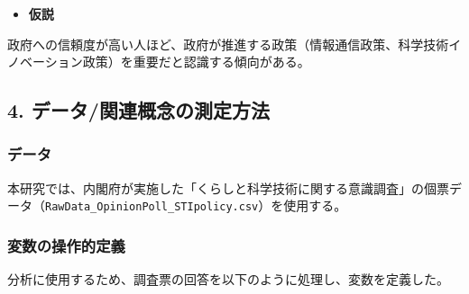 \documentclass[
  xelatex]{bxjsarticle}
\providecommand{\tightlist}{%
  \setlength{\itemsep}{0pt}\setlength{\parskip}{0pt}}
\begin{document}
\begin{itemize}
\tightlist
\item
  \textbf{仮説}
\end{itemize}

政府への信頼度が高い人ほど、政府が推進する政策（情報通信政策、科学技術イノベーション政策）を重要だと認識する傾向がある。

\subsection{4.
データ/関連概念の測定方法}\label{ux30c7ux30fcux30bfux95a2ux9023ux6982ux5ff5ux306eux6e2cux5b9aux65b9ux6cd5}

\subsubsection{データ}\label{ux30c7ux30fcux30bf}

本研究では、内閣府が実施した「くらしと科学技術に関する意識調査」の個票データ（\texttt{RawData\_OpinionPoll\_STIpolicy.csv}）を使用する。

\subsubsection{変数の操作的定義}\label{ux5909ux6570ux306eux64cdux4f5cux7684ux5b9aux7fa9}

分析に使用するため、調査票の回答を以下のように処理し、変数を定義した。
\end{document}
